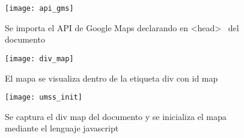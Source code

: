       \begin{figure}[!hbp]
        \begin{center}
          \texttt{[image: api\_gms]}
        \end{center}
        \caption[API de Google Maps declarado]{Se importa el API de Google Maps declarando en  <head>  ~del documento}
        \label{fig:api_gm}


        \begin{center}
          \texttt{[image: div\_map]}
        \end{center}
        \caption[Div con id map para el Mapa]{El mapa se visualiza dentro de la etiqueta div con id map}
        \label{fig:div_map}


        \begin{center}
          \texttt{[image: umss\_init]}
        \end{center}
        \caption[UMSS javascript]{Se captura el div map del documento y se inicializa el mapa mediante el lenguaje javascript}
        \label{fig:umss_js}
      \end{figure}
      




